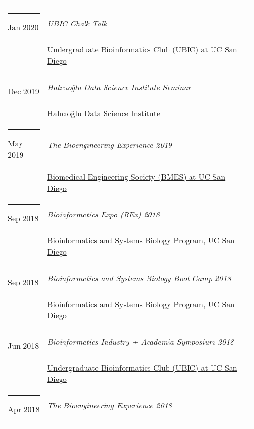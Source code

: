 \documentclass[margin,line]{res}
\begin{document}
\begin{resume}
\begin{longtable}{@{}p{0.7in}p{4in}}
\hspace*{-4mm} \rule{-1mm}{5mm} Jan 2020 & \textit{UBIC Chalk Talk}\\*
\hspace*{-4mm} & \hspace{4mm} \href{http://ubicucsd.github.io/}{Undergraduate Bioinformatics Club (UBIC) at UC San Diego}\\
\hspace*{-4mm} \rule{-1mm}{5mm} Dec 2019 & \textit{Hal{\i}c{\i}o{\u g}lu Data Science Institute Seminar}\\*
\hspace*{-4mm} & \hspace{4mm} \href{https://datascience.ucsd.edu/}{Hal{\i}c{\i}o{\u g}lu Data Science Institute}\\
\hspace*{-4mm} \rule{-1mm}{5mm} May 2019 & \textit{The Bioengineering Experience 2019}\\*
\hspace*{-4mm} & \hspace{4mm} \href{http://bmes.ucsd.edu/}{Biomedical Engineering Society (BMES) at UC San Diego}\\
\hspace*{-4mm} \rule{-1mm}{5mm} Sep 2018 & \textit{Bioinformatics Expo (BEx) 2018}\\*
\hspace*{-4mm} & \hspace{4mm} \href{http://bioinformatics.ucsd.edu/}{Bioinformatics and Systems Biology Program, UC San Diego}\\
\hspace*{-4mm} \rule{-1mm}{5mm} Sep 2018 & \textit{Bioinformatics and Systems Biology Boot Camp 2018}\\*
\hspace*{-4mm} & \hspace{4mm} \href{http://bioinformatics.ucsd.edu/}{Bioinformatics and Systems Biology Program, UC San Diego}\\
\hspace*{-4mm} \rule{-1mm}{5mm} Jun 2018 & \textit{Bioinformatics Industry + Academia Symposium 2018}\\*
\hspace*{-4mm} & \hspace{4mm} \href{http://ubicucsd.github.io/}{Undergraduate Bioinformatics Club (UBIC) at UC San Diego}\\
\hspace*{-4mm} \rule{-1mm}{5mm} Apr 2018 & \textit{The Bioengineering Experience 2018}\\*

\end{longtable}
\end{resume}
\end{document}
